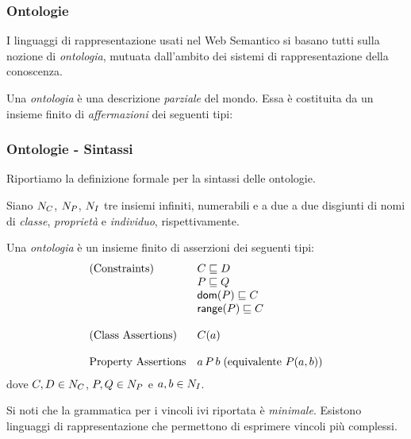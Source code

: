 \documentclass[8pt]{beamer}
\begin{document}
\begin{frame}
 \frametitle{Ontologie}
 
 I linguaggi di rappresentazione usati nel Web Semantico
 si basano tutti sulla nozione di \emph{ontologia}, mutuata
 dall'ambito dei sistemi di rappresentazione della conoscenza.
 \vspace{\baselineskip}

 Una \emph{ontologia} \`e una descrizione \emph{parziale} del mondo.
 Essa \`e costituita da un insieme finito di \emph{affermazioni}
 dei seguenti tipi:
 \vspace{\baselineskip}



\end{frame}

\begin{frame}
\frametitle{Ontologie - Sintassi}

Riportiamo la definizione formale per la sintassi delle ontologie.
\vspace{\baselineskip}

Siano $N_C$, $N_P$, $N_I$ tre insiemi infiniti, numerabili e 
a due a due disgiunti di nomi di \emph{classe}, \emph{propriet\`a} e \emph{individuo},
rispettivamente.
\vspace{\baselineskip}

Una \emph{ontologia} \`e un insieme finito di asserzioni dei seguenti tipi:
\[
 \begin{array}{ll}
  \mbox{(Constraints)} & C \sqsubseteq D\\
  & P \sqsubseteq Q \\
  & \mathsf{dom}(P) \sqsubseteq C \\
  & \mathsf{range}(P) \sqsubseteq C \\
  &\\
  \mbox{(Class Assertions)} & C(a)\\
  &\\
  \mbox{Property Assertions} & a\,P\,b\;(\mbox{equivalente }P(a,b))\\
 \end{array}
\]
dove $C, D \in N_C$, $P, Q \in N_P$ e $a, b \in N_I$.
\vspace{\baselineskip}

Si noti che la grammatica per i vincoli ivi riportata \`e \emph{minimale}.
Esistono linguaggi di rappresentazione che permettono di esprimere vincoli
pi\`u complessi.
\end{frame}
\end{document}
